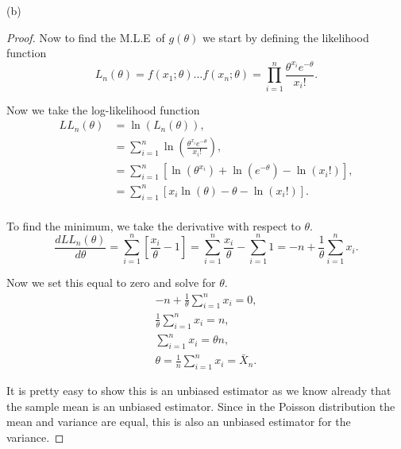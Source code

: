 \documentclass{article}
\newcommand{\mle}{M.L.E}
\begin{document}
(b)
\begin{proof}
    Now to find the \mle\ of $g(\theta)$ we start by defining the likelihood
    function
    \begin{equation*}
        L_n(\theta) = f(x_1; \theta)\dots f(x_n;\theta)
        = \prod_{i = 1}^n \frac{\theta^{x_i} e^{-\theta}}{x_i!}.
    \end{equation*}

    Now we take the log-likelihood function
    \begin{align*}
        LL_n(\theta) & = \ln(L_n(\theta)),                                                              \\
                     & = \sum_{i = 1}^n \ln\left(\frac{\theta^{x_i}e^{-\theta}}{x_i!}\right),           \\
                     & = \sum_{i = 1}^n \left[ \ln(\theta^{x_i}) + \ln(e^{-\theta}) - \ln(x_i!)\right], \\
                     & = \sum_{i = 1}^n \left[ x_i\ln(\theta) -\theta - \ln(x_i!)\right].               \\
    \end{align*}

    To find the minimum, we take the derivative with respect to $\theta$.
    \begin{equation*}
        \frac{dLL_n(\theta)}{d\theta}  = \sum_{i = 1}^n \left[\frac{x_i}{\theta} - 1\right]
        = \sum_{i = 1}^n\frac{x_i}{\theta} - \sum_{i = 1} ^n 1
        = -n + \frac{1}{\theta}\sum_{i = 1} ^n x_i.
    \end{equation*}

    Now we set this equal to zero and solve for $\theta$.
    \begin{equation*}
        \begin{gathered}
            -n + \frac{1}{\theta}\sum_{i = 1} ^n x_i = 0,\\
            \frac{1}{\theta}\sum_{i =1}^n x_i = n,\\
            \sum_{i =1}^n x_i = \theta n,\\
            \theta = \frac{1}{n}\sum_{i = 1}^n x_i = \bar{X}_n.
        \end{gathered}
    \end{equation*}

    It is pretty easy to show this is an unbiased estimator as we know already
    that the sample mean is an unbiased estimator. Since in the Poisson distribution
    the mean and variance are equal, this is also an unbiased estimator for the
    variance.


\end{proof}
\end{document}
